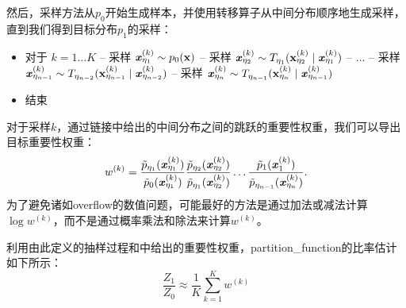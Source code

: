 然后，采样方法从$p_0$开始生成样本，并使用转移算子从中间分布顺序地生成采样，直到我们得到目标分布$p_1$的采样：
\begin{itemize}
	\item 对于 $k=1 \dots K$ 
		\newline
		\quad\quad -- 采样 $ \boldsymbol{\mathit{x}}_{\eta_1}^{(k)} \sim p_0(\mathbf{x}) $
		\newline
		\quad\quad -- 采样 $ \boldsymbol{\mathit{x}}_{\eta_2}^{(k)} \sim T_{\eta_1}(\mathbf{x}_{\eta_2}^{(k)} \mid \boldsymbol{\mathit{x}}_{\eta_1}^{(k)} ) $
		\newline
		\quad\quad -- $\dots$
		\newline
		\quad\quad -- 采样 $ \boldsymbol{\mathit{x}}_{\eta_{n-1}}^{(k)} \sim T_{\eta_{n-2}}(\mathbf{x}_{\eta_{n-1}}^{(k)} \mid \boldsymbol{\mathit{x}}_{\eta_{n-2}}^{(k)} ) $
		\newline
		\quad\quad -- 采样 $ \boldsymbol{\mathit{x}}_{\eta_n}^{(k)} \sim T_{\eta_{n-1}}(\mathbf{x}_{\eta_n}^{(k)} \mid \boldsymbol{\mathit{x}}_{\eta_{n-1}}^{(k)} ) $
	\item 结束
\end{itemize}


对于采样$k$，通过链接中给出的中间分布之间的跳跃的重要性权重，我们可以导出目标重要性权重：
\begin{equation}
\label{eq:18.52}
	w^{(k)} = \frac{ \tilde{p}_{\eta_1} ( \boldsymbol{\mathit{x}}_{\eta_1}^{(k)} )  }{  \tilde{p}_{0} ( \boldsymbol{\mathit{x}}_{\eta_1}^{(k)} )  }
\frac{ \tilde{p}_{\eta_2} ( \boldsymbol{\mathit{x}}_{\eta_2}^{(k)} )  }{  \tilde{p}_{\eta_1} ( \boldsymbol{\mathit{x}}_{\eta_2}^{(k)} )  }
\dots
\frac{ \tilde{p}_{1} ( \boldsymbol{\mathit{x}}_{1}^{(k)} )  }{  \tilde{p}_{\eta_{n-1}} ( \boldsymbol{\mathit{x}}_{\eta_n}^{(k)} )  } .
\end{equation}
为了避免诸如\gls{overflow}的数值问题，可能最好的方法是通过加法或减法计算$\log w^{(k)}$，而不是通过概率乘法和除法来计算$w^{(k)}$。


利用由此定义的抽样过程和中给出的重要性权重，\gls{partition_function}的比率估计如下所示：
\begin{equation}
	\frac{Z_1}{Z_0} \approx \frac{1}{K} \sum_{k=1}^K w^{(k)}
\end{equation}


